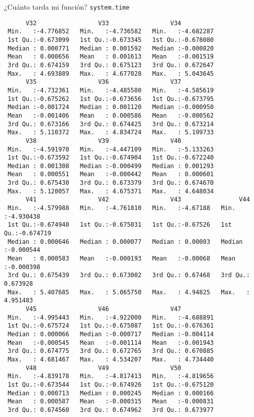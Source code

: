\documentclass[xcolor={usenames,svgnames,dvipsnames}]{beamer}
\begin{document}
\begin{frame}[label={sec:orga833b1a},fragile]{¿Cuánto tarda mi función? \texttt{system.time}}
\begin{verbatim}
      V32                 V33                 V34           
 Min.   :-4.776852   Min.   :-4.736582   Min.   :-4.682287  
 1st Qu.:-0.673099   1st Qu.:-0.673345   1st Qu.:-0.678080  
 Median : 0.000771   Median : 0.001592   Median :-0.000820  
 Mean   : 0.000656   Mean   : 0.001613   Mean   :-0.001519  
 3rd Qu.: 0.674159   3rd Qu.: 0.675123   3rd Qu.: 0.672647  
 Max.   : 4.693889   Max.   : 4.677028   Max.   : 5.043645  
      V35                 V36                 V37           
 Min.   :-4.732361   Min.   :-4.485580   Min.   :-4.585619  
 1st Qu.:-0.675262   1st Qu.:-0.673656   1st Qu.:-0.673795  
 Median :-0.001724   Median : 0.001120   Median :-0.000950  
 Mean   :-0.001406   Mean   : 0.000586   Mean   :-0.000562  
 3rd Qu.: 0.673166   3rd Qu.: 0.674425   3rd Qu.: 0.673214  
 Max.   : 5.110372   Max.   : 4.834724   Max.   : 5.199733  
      V38                 V39                 V40           
 Min.   :-4.591970   Min.   :-4.447109   Min.   :-5.133263  
 1st Qu.:-0.673592   1st Qu.:-0.674904   1st Qu.:-0.672240  
 Median : 0.001308   Median :-0.000499   Median : 0.001293  
 Mean   : 0.000551   Mean   :-0.000442   Mean   : 0.000601  
 3rd Qu.: 0.675430   3rd Qu.: 0.673379   3rd Qu.: 0.674670  
 Max.   : 5.120057   Max.   : 4.675371   Max.   : 4.648034  
      V41                 V42                 V43                V44           
 Min.   :-4.579988   Min.   :-4.761810   Min.   :-4.67188   Min.   :-4.930438  
 1st Qu.:-0.674940   1st Qu.:-0.675031   1st Qu.:-0.67526   1st Qu.:-0.674719  
 Median : 0.000646   Median : 0.000077   Median : 0.00003   Median :-0.000544  
 Mean   : 0.000583   Mean   :-0.000193   Mean   :-0.00068   Mean   :-0.000398  
 3rd Qu.: 0.675439   3rd Qu.: 0.673002   3rd Qu.: 0.67468   3rd Qu.: 0.673928  
 Max.   : 5.407685   Max.   : 5.065750   Max.   : 4.94825   Max.   : 4.951483  
      V45                 V46                 V47           
 Min.   :-4.995443   Min.   :-4.922000   Min.   :-4.688891  
 1st Qu.:-0.675724   1st Qu.:-0.675087   1st Qu.:-0.676361  
 Median : 0.000066   Median :-0.000717   Median :-0.004114  
 Mean   :-0.000545   Mean   :-0.001114   Mean   :-0.001943  
 3rd Qu.: 0.674775   3rd Qu.: 0.672765   3rd Qu.: 0.670885  
 Max.   : 4.681467   Max.   : 4.534207   Max.   : 4.734440  
      V48                 V49                 V50           
 Min.   :-4.839178   Min.   :-4.817413   Min.   :-4.819656  
 1st Qu.:-0.673544   1st Qu.:-0.674926   1st Qu.:-0.675120  
 Median : 0.000713   Median : 0.000245   Median : 0.000166  
 Mean   : 0.000587   Mean   :-0.000315   Mean   :-0.000831  
 3rd Qu.: 0.674560   3rd Qu.: 0.674962   3rd Qu.: 0.673977  

\end{verbatim}
\end{frame}
\end{document}
